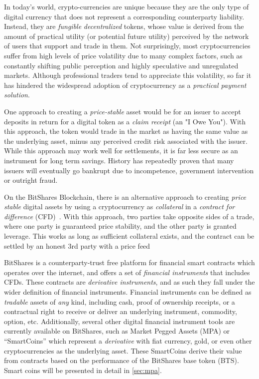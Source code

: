 In today's world, crypto-currencies are unique because they are the only type
of digital currency that does not represent a corresponding counterparty
liability. Instead, they are \emph{fungible} \emph{decentralized} tokens, whose
value is derived from the amount of practical utility (or potential future
utility) perceived by the network of users that support and trade in them. Not
surprisingly, most cryptocurrencies suffer from high levels of price volatility
due to many complex factors, such as constantly shifting public perception and
highly speculative and unregulated markets. Although professional traders tend
to appreciate this volatility, so far it has hindered the widespread adoption
of cryptocurrency as a \emph{practical payment solution}.

One approach to creating a \emph{price-stable} asset would be for an issuer to
accept deposits in return for a digital token as a \emph{claim receipt} (an "I
Owe You"). With this approach, the token would trade in the market as having
the same value as the underlying asset, minus any perceived credit risk
associated with the issuer. While this approach may work well for settlements,
it is far less secure as an instrument for long term savings. History has
repeatedly proven that many issuers will eventually go bankrupt due to
incompetence, government intervention or outright fraud.

On the BitShares Blockchain, there is an alternative approach to creating \emph{price
stable} digital assets by using a cryptocurrency as \emph{collateral} in a
\emph{contract for difference} (CFD)~\cite{def:cfd}. With this approach, two
parties take opposite sides of a trade, where one party is guaranteed price
stability, and the other party is granted leverage. This works as long as
sufficient collateral exists, and the contract can be settled by an honest 3rd
party with a price feed

BitShares is a counterparty-trust free platform for financial smart contracts
which operates over the internet, and offers a set of \emph{financial
instruments} that includes CFDs. These contracts are \emph{derivative
instruments}, and as such they fall under the wider definition of financial
instruments. Financial instruments can be defined as \emph{tradable} assets of
\emph{any} kind, including cash, proof of ownership receipts, or a contractual
right to receive or deliver an underlying instrument, commodity, option, etc.
Additionally, several other digital financial instrument tools are currently
available on BitShares, such as Market Pegged Assets (MPA) or ``SmartCoins''
which represent a \emph{derivative} with fiat currency, gold, or even other
cryptocurrencies as the underlying asset. These SmartCoins derive their value
from contracts based on the performance of the BitShares base token (BTS).
Smart coins will be presented in detail in \cref{sec:mpa}. 
